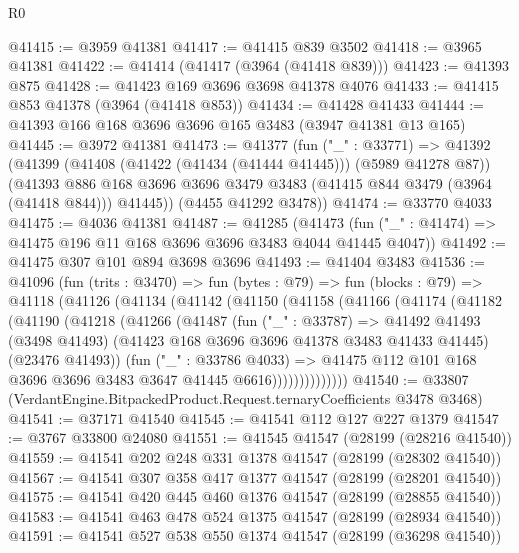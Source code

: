 \begin{lexlean}{R0}
\begin{coremodule}
@41415 := @3959 @41381
@41417 := @41415 @839 @3502
@41418 := @3965 @41381
@41422 := @41414 (@41417 (@3964 (@41418 @839)))
@41423 := @41393 @875
@41428 := @41423 @169 @3696 @3698 @41378 @4076
@41433 := @41415 @853 @41378 (@3964 (@41418 @853))
@41434 := @41428 @41433
@41444 := @41393 @166 @168 @3696 @3696 @165 @3483 (@3947 @41381 @13 @165)
@41445 := @3972 @41381
@41473 := @41377
    (fun ("_" : @33771) =>
    @41392
      (@41399
        (@41408 (@41422 (@41434 (@41444 @41445))) (@5989 @41278 @87))
        (@41393 @886 @168 @3696 @3696 @3479 @3483 (@41415 @844 @3479 (@3964 (@41418 @844))) @41445))
      (@4455 @41292 @3478))
@41474 := @33770 @4033
@41475 := @4036 @41381
@41487 := @41285
    (@41473 (fun ("_" : @41474) => @41475 @196 @11 @168 @3696 @3696 @3483 @4044 @41445 @4047))
@41492 := @41475 @307 @101 @894 @3698 @3696
@41493 := @41404 @3483
@41536 := @41096
    (fun (trits : @3470) =>
    fun (bytes : @79) =>
    fun (blocks : @79) =>
    @41118
      (@41126
        (@41134
          (@41142
            (@41150
              (@41158
                (@41166
                  (@41174
                    (@41182
                      (@41190
                        (@41218
                          (@41266
                            (@41487
                              (fun ("_" : @33787) =>
                              @41492
                                @41493
                                (@3498 @41493)
                                (@41423 @168 @3696 @3696 @41378 @3483 @41433 @41445)
                                (@23476 @41493))
                              (fun ("_" : @33786 @4033) =>
                              @41475
                                @112
                                @101
                                @168
                                @3696
                                @3696
                                @3483
                                @3647
                                @41445
                                @6616))))))))))))))
@41540 := @33807 (VerdantEngine.BitpackedProduct.Request.ternaryCoefficients @3478 @3468)
@41541 := @37171 @41540
@41545 := @41541 @112 @127 @227 @1379
@41547 := @3767 @33800 @24080
@41551 := @41545 @41547 (@28199 (@28216 @41540))
@41559 := @41541 @202 @248 @331 @1378 @41547 (@28199 (@28302 @41540))
@41567 := @41541 @307 @358 @417 @1377 @41547 (@28199 (@28201 @41540))
@41575 := @41541 @420 @445 @460 @1376 @41547 (@28199 (@28855 @41540))
@41583 := @41541 @463 @478 @524 @1375 @41547 (@28199 (@28934 @41540))
@41591 := @41541 @527 @538 @550 @1374 @41547 (@28199 (@36298 @41540))

\end{coremodule}
\end{lexlean}
